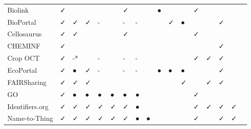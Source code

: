 \begin{table}
\begin{tabular}{lllllllllllllllll}
        Biolink &              ✓ &          &       &            &            &        ✓ &                &               &       ● &         &         &                          ✓ &        &                 &          &        \\
      BioPortal &              ✓ &        ✓ &     ✓ &          - &            &        - &              - &               &         &       ✓ &       ● &                            &        &               ✓ &          &        \\
    Cellosaurus &              ✓ &        ✓ &       &            &            &        ✓ &                &               &         &         &         &                          ✓ &        &                 &          &        \\
        CHEMINF &              ✓ &          &       &            &            &          &                &               &         &         &         &                            &        &               ✓ &          &        \\
       Crop OCT &              ✓ &       -* &       &          - &            &        - &              - &               &         &         &         &                          ✓ &      ✓ &               ✓ &          &        \\
      EcoPortal &              ✓ &        ● &     ✓ &          - &            &        - &              - &               &       ● &       ● &       ● &                            &        &               ✓ &          &        \\
    FAIRSharing &              ✓ &        ✓ &     ✓ &            &            &          &                &               &         &         &       ✓ &                            &      ✓ &               ✓ &          &        \\
             GO &              ✓ &        ● &     ● &          ● &          ● &        ● &              ● &               &         &         &         &                          ✓ &        &                 &          &        \\
Identifiers.org &              ✓ &        ✓ &     ✓ &          ✓ &          ✓ &        ✓ &              ● &               &         &         &         &                          ✓ &      ✓ &               ✓ &        ✓ &        \\
  Name-to-Thing &              ✓ &        ✓ &     ✓ &          ✓ &          ✓ &        ✓ &              ● &             ● &         &         &         &                          ✓ &        &               ✓ &        ✓ &        \\

\end{tabular}
\end{table}
